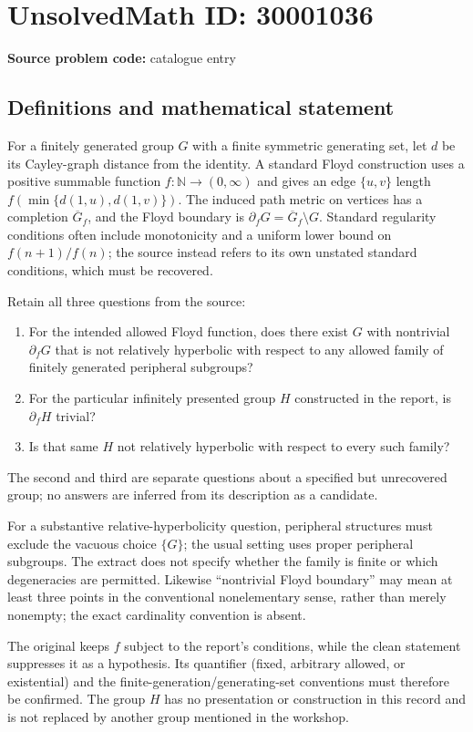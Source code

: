\documentclass[11pt]{article}
\newcommand{\N}{\mathbb{N}}
\begin{document}
\section*{UnsolvedMath ID: 30001036}
\textbf{Source problem code:} catalogue entry
\subsection{Definitions and mathematical statement}
For a finitely generated group $G$ with a finite symmetric generating set, let $d$ be its Cayley-graph distance from the identity. A standard Floyd construction uses a positive summable function $f:\N\to(0,\infty)$ and gives an edge $\{u,v\}$ length $f(\min\{d(1,u),d(1,v)\})$. The induced path metric on vertices has a completion $\overline G_f$, and the Floyd boundary is $\partial_fG=\overline G_f\setminus G$. Standard regularity conditions often include monotonicity and a uniform lower bound on $f(n+1)/f(n)$; the source instead refers to its own unstated standard conditions, which must be recovered.

Retain all three questions from the source:
\begin{enumerate}
\item For the intended allowed Floyd function, does there exist $G$ with nontrivial $\partial_fG$ that is not relatively hyperbolic with respect to any allowed family of finitely generated peripheral subgroups?
\item For the particular infinitely presented group $H$ constructed in the report, is $\partial_fH$ trivial?
\item Is that same $H$ not relatively hyperbolic with respect to every such family?
\end{enumerate}
The second and third are separate questions about a specified but unrecovered group; no answers are inferred from its description as a candidate.

For a substantive relative-hyperbolicity question, peripheral structures must exclude the vacuous choice $\{G\}$; the usual setting uses proper peripheral subgroups. The extract does not specify whether the family is finite or which degeneracies are permitted. Likewise ``nontrivial Floyd boundary'' may mean at least three points in the conventional nonelementary sense, rather than merely nonempty; the exact cardinality convention is absent.

The original keeps $f$ subject to the report's conditions, while the clean statement suppresses it as a hypothesis. Its quantifier (fixed, arbitrary allowed, or existential) and the finite-generation/generating-set conventions must therefore be confirmed. The group $H$ has no presentation or construction in this record and is not replaced by another group mentioned in the workshop.
\end{document}
